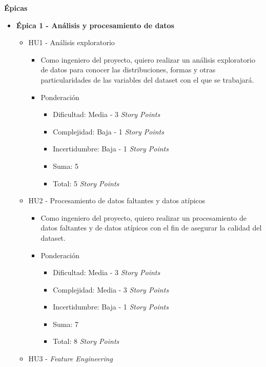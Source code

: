 \documentclass[
11pt, %
]{charter}
\begin{document}
\textbf{\'{E}picas}
\begin{itemize}
  \item \textbf{\'{E}pica 1 - Análisis y procesamiento de datos}
    \begin{itemize}
      \item HU1 - Análisis exploratorio
        \begin{itemize}
            \item Como ingeniero del proyecto, quiero realizar un análisis exploratorio de datos para conocer las distribuciones, formas y otras particularidades de las variables del dataset con el que se trabajará.
            \item Ponderación
            \begin{itemize}
                \item Dificultad: Media - 3 \textit{Story Points}
                \item Complejidad: Baja - 1 \textit{Story Points}
                \item Incertidumbre: Baja - 1 \textit{Story Points}
                \item Suma: 5
                \item Total: 5 \textit{Story Points}
            \end{itemize}            
        \end{itemize}
      \item HU2 - Procesamiento de datos faltantes y datos atípicos
        \begin{itemize}
            \item Como ingeniero del proyecto, quiero realizar un procesamiento de datos faltantes y de datos atípicos con el fin de asegurar la calidad del dataset.
            \item Ponderación
            \begin{itemize}
                \item Dificultad: Media - 3 \textit{Story Points}
                \item Complejidad: Media - 3 \textit{Story Points}
                \item Incertidumbre: Baja - 1 \textit{Story Points}
                \item Suma: 7
                \item Total: 8 \textit{Story Points}
            \end{itemize}
        \end{itemize}
      \item HU3 - \textit{Feature Engineering}

\end{itemize}
\end{itemize}
\end{document}

